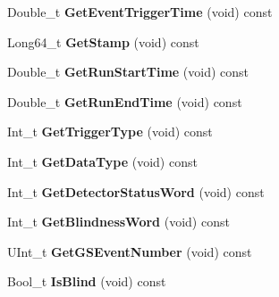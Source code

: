 \begin{DoxyCompactItemize}
\item 
\hypertarget{class_edw_event_base_a899ecad999103679fbe0ac65a0ec7796}{
Double\_\-t {\bfseries GetEventTriggerTime} (void) const }
\label{class_edw_event_base_a899ecad999103679fbe0ac65a0ec7796}

\item 
\hypertarget{class_edw_event_base_abb300a95dd5e3e968cb6d8f3cf70a235}{
Long64\_\-t {\bfseries GetStamp} (void) const }
\label{class_edw_event_base_abb300a95dd5e3e968cb6d8f3cf70a235}

\item 
\hypertarget{class_edw_event_base_a69e88b2ba110b85c068273a437a23a54}{
Double\_\-t {\bfseries GetRunStartTime} (void) const }
\label{class_edw_event_base_a69e88b2ba110b85c068273a437a23a54}

\item 
\hypertarget{class_edw_event_base_ac6221b4a938c6211c5a9bf591f6b2d34}{
Double\_\-t {\bfseries GetRunEndTime} (void) const }
\label{class_edw_event_base_ac6221b4a938c6211c5a9bf591f6b2d34}

\item 
\hypertarget{class_edw_event_base_ae1ae9cfcf2c9799113a408706abaafe7}{
Int\_\-t {\bfseries GetTriggerType} (void) const }
\label{class_edw_event_base_ae1ae9cfcf2c9799113a408706abaafe7}

\item 
\hypertarget{class_edw_event_base_a3b9a484706a21059de2626ea9f2939bc}{
Int\_\-t {\bfseries GetDataType} (void) const }
\label{class_edw_event_base_a3b9a484706a21059de2626ea9f2939bc}

\item 
\hypertarget{class_edw_event_base_a62b7831b1be4a5777beef5cb50e0541e}{
Int\_\-t {\bfseries GetDetectorStatusWord} (void) const }
\label{class_edw_event_base_a62b7831b1be4a5777beef5cb50e0541e}

\item 
\hypertarget{class_edw_event_base_a287912b0bd45a2b0961b60f7af2996b6}{
Int\_\-t {\bfseries GetBlindnessWord} (void) const }
\label{class_edw_event_base_a287912b0bd45a2b0961b60f7af2996b6}

\item 
\hypertarget{class_edw_event_base_abc4cca76451a738a5d32f3657aa57055}{
UInt\_\-t {\bfseries GetGSEventNumber} (void) const }
\label{class_edw_event_base_abc4cca76451a738a5d32f3657aa57055}

\item 
\hypertarget{class_edw_event_base_ac158254917e1a09c0027aca2e1232833}{
Bool\_\-t {\bfseries IsBlind} (void) const }
\label{class_edw_event_base_ac158254917e1a09c0027aca2e1232833}


\end{DoxyCompactItemize}
